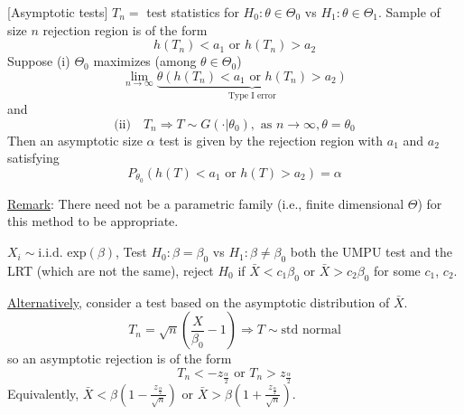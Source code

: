 \documentclass[english, 11pt]{article}
\newcommand{\lp}{\left(}
\newcommand{\rp}{\right)}
\begin{document}
\begin{defn}\label{defn:527}[Asymptotic tests]
$T_n=$ test statistics for $H_0:\theta\in \Theta_0$ vs $H_1:\theta\in\Theta_1$. Sample of size $n$ rejection region is of the form
$$
h(T_n)<a_1\text{  or  }h(T_n)>a_2
$$
Suppose (i) $\Theta_0$ maximizes (among $\theta\in\Theta_0$)
$$
\lim_{n\to \infty}\underbrace{{\theta}\lp h(T_n)<a_1\text{ or }h(T_n)>a_2\rp}_{\text{Type I error}}
$$
and 
$$
\text{(ii)}\quad T_n\Rightarrow T\sim G(\cdot|\theta_0), \text{ as }n\to \infty, \theta=\theta_0
$$
Then an asymptotic size $\alpha$ test is given by the rejection region with $a_1$ and $a_2$ satisfying 
$$
P_{\theta_0}(h(T)<a_1\text{ or }h(T)>a_2)=\alpha
$$
\end{defn}


\underline{Remark}: There need not be a parametric family (i.e., finite dimensional $\Theta$) for this method to be appropriate.

\begin{exmp}
$X_i\sim \text{i.i.d. exp}(\beta)$, Test $H_0:\beta=\beta_0$ vs $H_1:\beta\not=\beta_0$ both the UMPU test and the LRT (which are not the  same), reject $H_0$ if $\bar{X}<c_1\beta_0$ or $\bar{X}>c_2\beta_0$ for some $c_1$, $c_2$.

\underline{Alternatively}, consider a test based on the asymptotic distribution of $\bar{X}$.
$$
T_n=\sqrt{n}\lp \frac{X}{\beta_0}-1\rp\Rightarrow T\sim \text{std normal}
$$
so an asymptotic rejection is of the form
$$
T_n<-z_{\frac{\alpha}{2}} \text{ or } T_n>z_{\frac{\alpha}{2}}
$$
Equivalently, $\bar{X}<\beta\lp 1-\frac{z_{\frac{\alpha}{2}}}{\sqrt{n}}\rp$ or $\bar{X}>\beta\lp 1+\frac{z_{\frac{\alpha}{2}}}{\sqrt{n}}\rp$.
\end{exmp}
\end{document}
